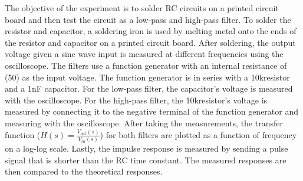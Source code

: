 The objective of the experiment is to solder RC circuits on a printed circuit board and then test the circuit as a low-pass and high-pass filter. To solder the resistor and capacitor, a soldering iron is used by melting metal onto the ends of the resistor and capacitor on a printed circuit board. After soldering, the output voltage given a sine wave input is measured at different frequencies using the oscilloscope. The filters use a function generator with an internal resistance of (50\textOmega) as the input voltage. The function generator is in series with a 10k\textOmega resistor and a 1nF capacitor. For the low-pass filter, the capacitor's voltage is measured with the oscilloscope. For the high-pass filter, the 10k\textOmega resistor's voltage is measured by connecting it to the negative terminal of the function generator and measuring with the oscilloscope. After taking the measurements, the transfer function ($H(s) = \frac{V_{out}(s)}{V_{in}(s)}$) for both filters are plotted as a function of frequency on a log-log scale. Lastly, the impulse response is measured by sending a pulse signal that is shorter than the RC time constant. The measured responses are then compared to the theoretical responses. \\
